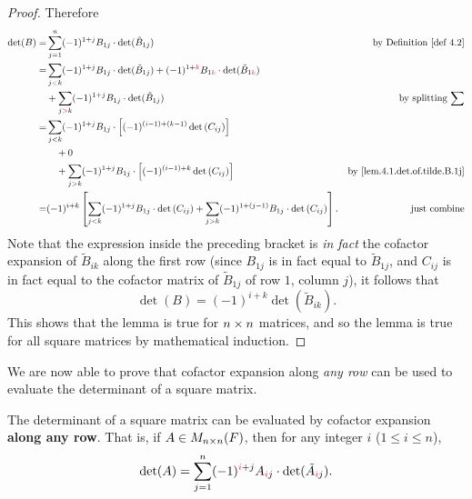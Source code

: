 \begin{proof}
Therefore
\begin{align*}
    \det(B) = & \sum_{j=1}^{n} (-1)^{1+j} B_{1 j} \cdot \det(\tilde{B}_{1 j}) & \text{by \DEF{4.2}} \\
            = & \sum_{j\RED{<}k} (-1)^{1+j} B_{1 j} \cdot \det(\tilde{B}_{1 j})
              + (-1)^{1+\RED{k}} B_{1 \RED{k}} \cdot \det(\tilde{B}_{1 \RED{k}}) \\
            & + \sum_{j\RED{>}k} (-1)^{1+j} B_{1 j} \cdot \det(\tilde{B}_{1 j}) & \text{by splitting \(\sum\)} \\
            = & \sum_{j<k}(-1)^{1+j} B_{1j} \cdot\left[ (-1)^{(i-1)+(k-1)} \det\left(C_{i j}\right) \right] \\
            & \quad + 0 \\
            & \quad + \sum_{j>k}(-1)^{1+j} B_{1 j} \cdot\left[(-1)^{(i-1)+k} \det\left(C_{i j}\right)\right] & \text{by \ref{lem.4.1.det.of.tilde.B.1j}} \\
            = & (-1)^{i+k}\left[
                    \sum_{j<k}(-1)^{1+j} B_{1 j} \cdot \det\left(C_{i j}\right)
                    + \sum_{j>k}(-1)^{1+(j-1)} B_{1 j} \cdot \det\left(C_{i j}\right)
                \right]. & \text{just combine}
\end{align*}
Note that the expression inside the preceding bracket is \emph{in fact} the cofactor expansion of \(\tilde{B}_{ik}\) along the first row
(since \(B_{1j}\) is in fact equal to \(\tilde{B}_{1j}\), and \(C_{ij}\) is in fact equal to the cofactor matrix of \(\tilde{B}_{1j}\) of row \(1\), column \(j\)),
it follows that
\[
    \det(B) = (-1)^{i + k} \det(\tilde{B}_{ik}).
\]
This shows that the lemma is true for \(n \times n\) matrices, and so the lemma is true for all square matrices by mathematical induction.
\end{proof}

We are now able to prove that cofactor expansion along \emph{any row} can be used to evaluate the determinant of a square matrix.

\begin{theorem} \label{thm 4.4}
The determinant of a square matrix can be evaluated by cofactor expansion \textbf{along any row}.
That is, if \(A \in M_{n \times n}(F)\), then for any integer \(i\) (\(1 \le i \le n\)),
\[
    \det(A) = \sum_{j = 1}^n (-1)^{\RED{i} + j} A_{\RED{i}j} \cdot \det(\tilde{A}_{\RED{i}j}).
\]
\end{theorem}

